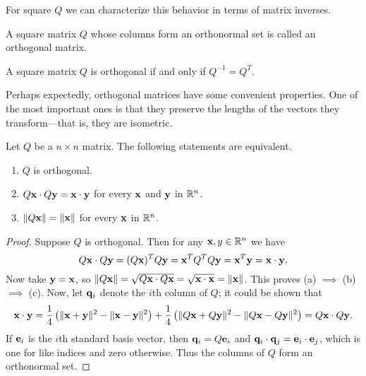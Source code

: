 \documentclass[../m073main.tex]{subfiles}
\begin{document}
For square $Q$ we can characterize this behavior in terms of matrix inverses.

\begin{definition}
	A square matrix $Q$ whose columns form an orthonormal set is called an orthogonal matrix.
\end{definition}

\begin{theorem}
	A square matrix $Q$ is orthogonal if and only if $Q^{-1} = Q^T$.
\end{theorem}

Perhaps expectedly, orthogonal matrices have some convenient properties.
One of the most important ones is that they preserve the lengths of the vectors they transform---that is, they are isometric.

\begin{theorem}
	Let $Q$ be a $n \times n$ matrix.
	The following statements are equivalent.
	\begin{multicols}{2}
		\begin{enumerate}[label=(\alph*)]
			\item $Q$ is orthogonal.
			\item $Q \mathbf{x} \cdot Q \mathbf{y} = \mathbf{x} \cdot \mathbf{y}$ for every $\mathbf{x}$ and $\mathbf{y}$ in $\mathbb{R}^n$.
			\item $\|Q \mathbf{x}\| = \|\mathbf{x}\|$ for every $\mathbf{x}$ in $\mathbb{R}^n$.
		\end{enumerate}
	\end{multicols}
\end{theorem}

\begin{proof}
	Suppose $Q$ is orthogonal.
	Then for any $\mathbf{x},y \in \mathbb{R}^n$ we have
	\[ Q\mathbf{x} \cdot Q\mathbf{y} = (Q\mathbf{x})^T Q\mathbf{y} = \mathbf{x}^T Q^T Q \mathbf{y} = \mathbf{x}^T \mathbf{y} = \mathbf{x} \cdot \mathbf{y}. \]
	Now take $\mathbf{y} = \mathbf{x}$, so $\| Q\mathbf{x} \| = \sqrt{Q\mathbf{x} \cdot Q\mathbf{x}} = \sqrt{\mathbf{x} \cdot \mathbf{x}} = \| \mathbf{x} \|$.
	This proves (a) $\implies$ (b) $\implies$ (c).
	Now, let $\mathbf{q}_i$ denote the $i$th column of $Q$; it could be shown that
	\[ \mathbf{x} \cdot \mathbf{y} = \frac{1}{4} \left( \| \mathbf{x} + \mathbf{y} \|^2 - \| \mathbf{x} - \mathbf{y} \|^2 \right) + \frac{1}{4} \left( \| Q\mathbf{x} + Q\mathbf{y} \|^2 - \| Q\mathbf{x} - Q\mathbf{y} \|^2 \right) = Q\mathbf{x} \cdot Q\mathbf{y}. \]
	If $\mathbf{e}_i$ is the $i$th standard basis vector, then $\mathbf{q}_i = Q\mathbf{e}_i$ and $\mathbf{q}_i \cdot \mathbf{q}_j = \mathbf{e}_i \cdot \mathbf{e}_j$, which is one for like indices and zero otherwise.
	Thus the columns of $Q$ form an orthonormal set.
\end{proof}
\end{document}
